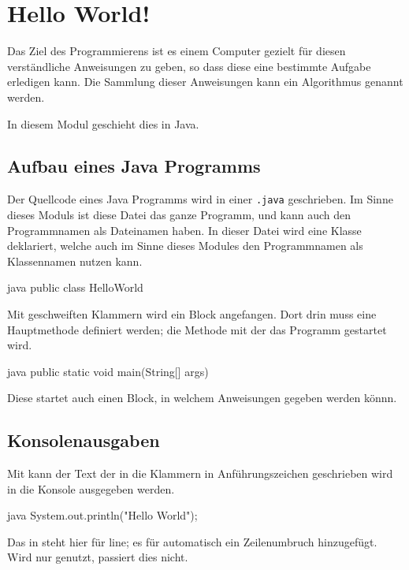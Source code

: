 \documentclass{article}
\begin{document}
\section{Hello World!} 
Das Ziel des Programmierens ist es einem Computer gezielt für diesen verständliche Anweisungen zu geben, so dass diese eine bestimmte Aufgabe erledigen kann. Die Sammlung dieser Anweisungen kann ein Algorithmus genannt werden.

In diesem Modul geschieht dies in Java.

\subsection{Aufbau eines Java Programms}
Der Quellcode eines Java Programms wird in einer \texttt{.java} geschrieben. Im Sinne dieses Moduls ist diese Datei das ganze Programm, und kann auch den Programmnamen als Dateinamen haben. In dieser Datei wird eine Klasse deklariert, welche auch im Sinne dieses Modules den Programmnamen als Klassennamen nutzen kann.
\begin{slsourcecode}{java}
public class HelloWorld
\end{slsourcecode}
Mit geschweiften Klammern wird ein Block angefangen. Dort drin muss eine Hauptmethode definiert werden; die Methode mit der das Programm gestartet wird.
\begin{slsourcecode}{java}
public static void main(String[] args)
\end{slsourcecode}
Diese startet auch einen Block, in welchem Anweisungen gegeben werden könnn.


\subsection{Konsolenausgaben}
Mit  kann der Text der in die Klammern in Anführungszeichen geschrieben wird in die Konsole ausgegeben werden.
\begin{slsourcecode}{java}
System.out.println("Hello World");
\end{slsourcecode}
Das  in  steht hier für line; es für automatisch ein Zeilenumbruch hinzugefügt. Wird nur  genutzt, passiert dies nicht.

\end{document}
